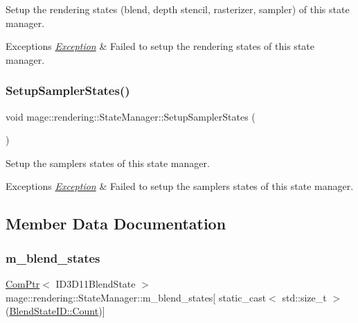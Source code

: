 Setup the rendering states (blend, depth stencil, rasterizer, sampler) of this state manager.


\begin{DoxyExceptions}{Exceptions}
{\em \mbox{\hyperlink{classmage_1_1_exception}{Exception}}} & Failed to setup the rendering states of this state manager. \\
\hline
\end{DoxyExceptions}
\mbox{\label{classmage_1_1rendering_1_1_state_manager_abb74b460f834a402f9ab7527afa64f64}} 
\subsubsection{\texorpdfstring{Setup\+Sampler\+States()}{SetupSamplerStates()}}
{\footnotesize\ttfamily void mage\+::rendering\+::\+State\+Manager\+::\+Setup\+Sampler\+States (\begin{DoxyParamCaption}{ }\end{DoxyParamCaption})\hspace{0.3cm}{\ttfamily [private]}}

Setup the samplers states of this state manager.


\begin{DoxyExceptions}{Exceptions}
{\em \mbox{\hyperlink{classmage_1_1_exception}{Exception}}} & Failed to setup the samplers states of this state manager. \\
\hline
\end{DoxyExceptions}


\subsection{Member Data Documentation}
\mbox{\label{classmage_1_1rendering_1_1_state_manager_a382fdb43f486733cc68ed70ab082500f}} 
\subsubsection{\texorpdfstring{m\+\_\+blend\+\_\+states}{m\_blend\_states}}
{\footnotesize\ttfamily \mbox{\hyperlink{namespacemage_ae74f374780900893caa5555d1031fd79}{Com\+Ptr}}$<$ I\+D3\+D11\+Blend\+State $>$ mage\+::rendering\+::\+State\+Manager\+::m\+\_\+blend\+\_\+states\mbox{[} static\+\_\+cast$<$ std\+::size\+\_\+t $>$(\mbox{\hyperlink{namespacemage_1_1rendering_abdf11cdb816b9208aec6c3a81f7564abae93f994f01c537c4e2f7d8528c3eb5e9}{Blend\+State\+I\+D\+::\+Count}})\mbox{]}\hspace{0.3cm}{\ttfamily [private]}}

